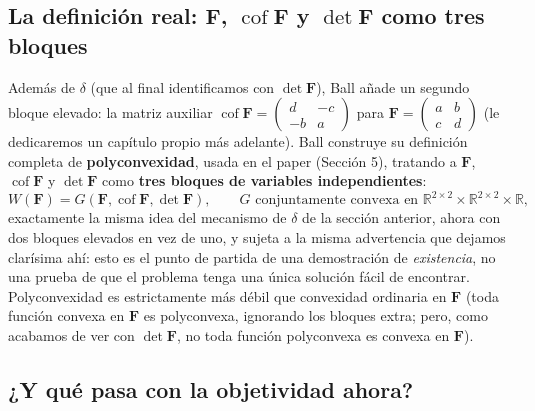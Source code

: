 \documentclass[11pt,a4paper]{article}
\newcommand{\Cof}{\operatorname{cof}}
\newcommand{\R}{\mathbb{R}}
\begin{document}
\subsection{La definici\'on real: $\bm F$, $\Cof\bm F$ y $\det\bm F$ como tres bloques}
\label{sec:appB-cofF-def}

Adem\'as de $\delta$ (que al final identificamos con $\det\bm F$), Ball
a\~nade un segundo bloque elevado: la matriz auxiliar
$\Cof\bm F=\begin{pmatrix}d&-c\\-b&a\end{pmatrix}$ para
$\bm F=\begin{pmatrix}a&b\\c&d\end{pmatrix}$ (le dedicaremos un
cap\'itulo propio m\'as adelante). Ball construye su definici\'on
completa de \textbf{polyconvexidad}, usada en el paper (Secci\'on 5),
tratando a $\bm F$, $\Cof\bm F$ y $\det\bm F$ como \textbf{tres bloques
de variables independientes}:
\begin{equation}
 W(\bm F)=G(\bm F,\Cof\bm F,\det\bm F),
 \qquad G\text{ conjuntamente convexa en }
 \R^{2\times2}\times\R^{2\times2}\times\R,
 \label{eq:appB-polyconvex-def}
\end{equation}
exactamente la misma idea del mecanismo de $\delta$ de la secci\'on
anterior, ahora con dos bloques elevados en vez de uno, y sujeta a la
misma advertencia que dejamos clar\'isima ah\'i: esto es el punto de
partida de una demostraci\'on de \emph{existencia}, no una prueba de
que el problema tenga una \'unica soluci\'on f\'acil de encontrar.
Polyconvexidad es estrictamente m\'as d\'ebil que convexidad ordinaria
en $\bm F$ (toda funci\'on convexa en $\bm F$ es polyconvexa,
ignorando los bloques extra; pero, como acabamos de ver con
$\det\bm F$, no toda funci\'on polyconvexa es convexa en $\bm F$).

\subsection{¿Y qu\'e pasa con la objetividad ahora?}
\end{document}

